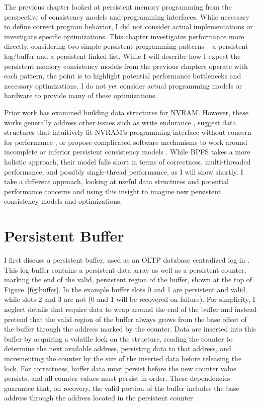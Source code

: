 The previous chapter looked at persistent memory programming from the perspective of consistency models and programming interfaces.
While necessary to define correct program behavior, I did not consider actual implementations or investigate specific optimizations.
This chapter investigates performance more directly, considering two simple persistent programming patterns -- a persistent log/buffer and a persistent linked list.
While I will describe how I expect the persistent memory consistency models from the previous chapters operate with each pattern, the point is to highlight potential performance bottlenecks and necessary optimizations.
I do not yet consider actual programming models or hardware to provide many of these optimizations.

Prior work has examined building data structures for NVRAM.
However, these works generally address other issues such as write endurance \cite{ChenGibbons11}, suggest data structures that intuitively fit NVRAM's programming interface without concern for performance \cite{VenkataramanTolia11}, or propose complicated software mechanisms to work around incomplete or inferior persistent consistency models \cite{FangHsiao11}.
While BPFS \cite{ConditNightingale09} takes a more holistic approach, their model falls short in terms of correctness, multi-threaded performance, and possibly single-thread performance, as I will show shortly.
I take a different approach, looking at useful data structures and potential performance concerns and using this insight to imagine new persistent consistency models and optimizations.

\section{Persistent Buffer}
\label{sec:PMC_patterns:Buffer}





I first discuss a persistent buffer, used as an OLTP database centralized log in \cite{FangHsiao11}.
This log buffer contains a persistent data array as well as a persistent counter, marking the end of the valid, persistent region of the buffer, shown at the top of Figure~\ref{fig:buffer}.
In the example buffer slots 0 and 1 are persistent and valid, while slots 2 and 3 are not (0 and 1 will be recovered on failure).
For simplicity, I neglect details that require data to wrap around the end of the buffer and instead pretend that the valid region of the buffer always grows from the base offset of the buffer through the address marked by the counter.
Data are inserted into this buffer by acquiring a volatile lock on the structure, reading the counter to determine the next available address, persisting data to that address, and incrementing the counter by the size of the inserted data before releasing the lock.
For correctness, buffer data must persist before the new counter value persists, and all counter values must persist in order.
These dependencies guarantee that, on recovery, the valid portion of the buffer includes the base address through the address located in the persistent counter.

